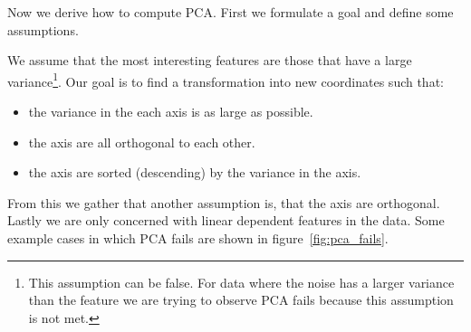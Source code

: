 \documentclass[a4paper]{IEEEtran}
\begin{document}
Now we derive how to compute PCA. First we formulate a goal and define some assumptions.

We assume that the most interesting features are those that have a large variance\footnote{This assumption can be false. For data where the noise has a larger variance than the feature we are trying to observe PCA fails because this assumption is not met.}. Our goal is to find a transformation into new coordinates such that:
\begin{itemize}
	\item the variance in the each axis is as large as possible.
	\item the axis are all orthogonal to each other.
	\item the axis are sorted (descending) by the variance in the axis.
\end{itemize}

From this we gather that another assumption is, that the axis are orthogonal. Lastly we are only concerned with linear dependent features in the data. Some example cases in which PCA fails are shown in figure~\ref{fig:pca_fails}.
\end{document}

